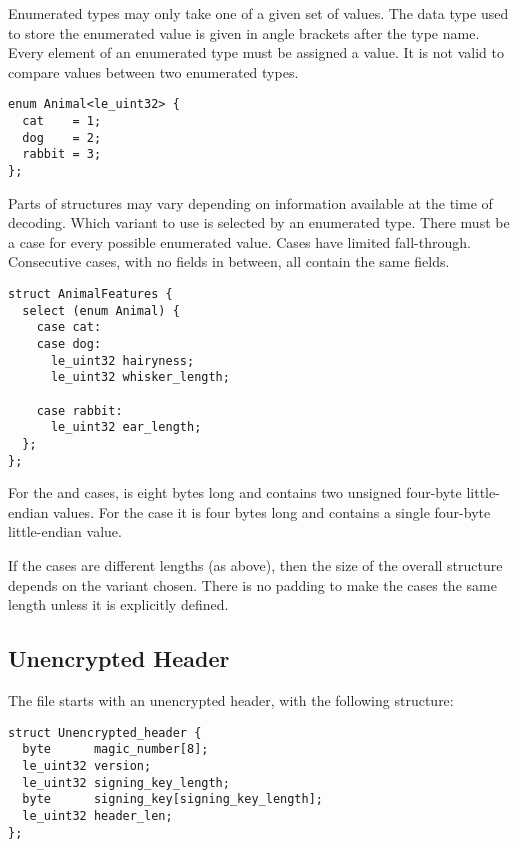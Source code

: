 Enumerated types may only take one of a given set of values.
%
The data type used to store the enumerated value is given in angle
brackets after the type name.
%
Every element of an enumerated type must be assigned a value.
%
It is not valid to compare values between two enumerated types.

\begin{verbatim}
enum Animal<le_uint32> {
  cat    = 1;
  dog    = 2;
  rabbit = 3;
};
\end{verbatim}

Parts of structures may vary depending on information available at the time of decoding.
%
Which variant to use is selected by an enumerated type.
%
There must be a case for every possible enumerated value.
%
Cases have limited fall-through.
%
Consecutive cases, with no fields in between, all contain the same fields.

\begin{verbatim}
struct AnimalFeatures {
  select (enum Animal) {
    case cat:
    case dog:
      le_uint32 hairyness;
      le_uint32 whisker_length;

    case rabbit:
      le_uint32 ear_length;
  };
};
\end{verbatim}

For the  and  cases,  is
eight bytes long and contains two unsigned four-byte little-endian
values.
%
For the  case it is four bytes long and contains a single
four-byte little-endian value.

If the cases are different lengths (as above), then the size of the
overall structure depends on the variant chosen.
%
There is no padding to make the cases the same length unless it is
explicitly defined.

\subsection{Unencrypted Header}

The file starts with an unencrypted header, with the following structure:

\begin{verbatim}
struct Unencrypted_header {
  byte      magic_number[8];
  le_uint32 version;
  le_uint32 signing_key_length;
  byte      signing_key[signing_key_length];
  le_uint32 header_len;
};
\end{verbatim}

